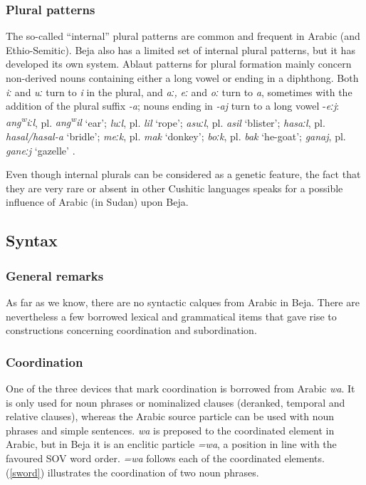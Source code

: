 \documentclass[output=paper]{langsci/langscibook}
\begin{document}
 \subsubsection{Plural patterns}

The so-called “internal” plural patterns are common and frequent in Arabic (and Ethio-Semitic). Beja also has a limited set of internal plural patterns, but it has developed its own system. Ablaut patterns for plural formation mainly concern non-derived nouns containing either a long vowel or ending in a diphthong. Both \textit{iː} and \textit{uː} turn to \textit{i} in the plural, and \textit{aː,} \textit{eː} and \textit{oː} turn to \textit{a}, sometimes with the addition of the plural suffix \textit{{}-}\textit{a}; nouns ending in \textit{{}-}\textit{aj} turn to a long vowel \nobreakdash-\textit{eːj}:  \textit{ang\textsuperscript{w}}\textit{iːl}, pl. \textit{ang\textsuperscript{w}}\textit{il} ‘ear’; \textit{luːl}, pl. \textit{lil} ‘rope’; \textit{asuːl}, pl. \textit{asil} ‘blister’; \textit{hasaːl}, pl. \textit{hasal/hasal-a} ‘bridle’; \textit{meːk}, pl. \textit{mak} ‘donkey’; \textit{boːk}, pl. \textit{bak} ‘he-goat’; \textit{ganaj}, pl. \textit{ganeːj} ‘gazelle’ \citep{Vanhove2017}. 

Even though internal plurals can be considered as a genetic feature, the fact that they are very rare or absent in other Cushitic languages \citep{Zaborski1986} speaks for a possible influence of Arabic (in Sudan) upon Beja.


 
 \subsection{Syntax}
 \subsubsection{General remarks}

As far as we know, there are no syntactic calques from Arabic in Beja. There are nevertheless a few borrowed lexical and grammatical items that gave rise to constructions concerning coordination and subordination.


 \subsubsection{Coordination}

One of the three devices that mark coordination is borrowed from Arabic \textit{wa}. It is only used for noun phrases or nominalized clauses (deranked, temporal and relative clauses), whereas the Arabic source particle can be used with noun phrases and simple sentences. \textit{wa} is preposed to the coordinated element in Arabic, but in Beja it is an enclitic particle \textit{=wa}, a position in line with the favoured SOV word order. \textit{=wa} follows each of the coordinated elements. (\ref{sword}) illustrates the coordination of two noun phrases.
\end{document}

